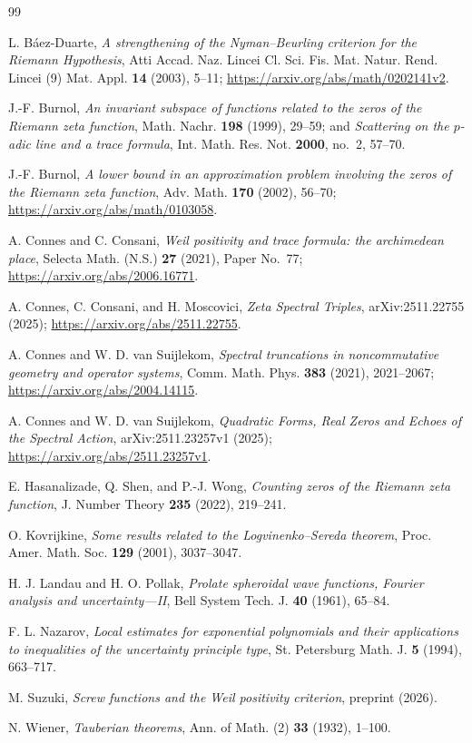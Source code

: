 \documentclass[11pt]{article}
\theoremstyle{remark}
\begin{document}
\begin{thebibliography}{99}

L. B\'aez-Duarte,
\emph{A strengthening of the Nyman--Beurling criterion for the Riemann Hypothesis},
Atti Accad. Naz. Lincei Cl. Sci. Fis. Mat. Natur. Rend. Lincei (9) Mat. Appl. \textbf{14} (2003), 5--11;
\url{https://arxiv.org/abs/math/0202141v2}.

J.-F. Burnol,
\emph{An invariant subspace of functions related to the zeros of the Riemann zeta function},
Math. Nachr. \textbf{198} (1999), 29--59; and \emph{Scattering on the $p$-adic line and a trace formula}, Int. Math. Res. Not. \textbf{2000}, no.~2, 57--70.

J.-F. Burnol,
\emph{A lower bound in an approximation problem involving the zeros of the Riemann zeta function},
Adv. Math. \textbf{170} (2002), 56--70;
\url{https://arxiv.org/abs/math/0103058}.

A. Connes and C. Consani,
\emph{Weil positivity and trace formula: the archimedean place},
Selecta Math. (N.S.) \textbf{27} (2021), Paper No.~77;
\url{https://arxiv.org/abs/2006.16771}.

A. Connes, C. Consani, and H. Moscovici,
\emph{Zeta Spectral Triples},
arXiv:2511.22755 (2025);
\url{https://arxiv.org/abs/2511.22755}.

A. Connes and W. D. van Suijlekom,
\emph{Spectral truncations in noncommutative geometry and operator systems},
Comm. Math. Phys. \textbf{383} (2021), 2021--2067;
\url{https://arxiv.org/abs/2004.14115}.

A. Connes and W. D. van Suijlekom,
\emph{Quadratic Forms, Real Zeros and Echoes of the Spectral Action},
arXiv:2511.23257v1 (2025);
\url{https://arxiv.org/abs/2511.23257v1}.

E. Hasanalizade, Q. Shen, and P.-J. Wong,
\emph{Counting zeros of the Riemann zeta function},
J. Number Theory \textbf{235} (2022), 219--241.

O. Kovrijkine,
\emph{Some results related to the Logvinenko--Sereda theorem},
Proc. Amer. Math. Soc. \textbf{129} (2001), 3037--3047.

H. J. Landau and H. O. Pollak,
\emph{Prolate spheroidal wave functions, Fourier analysis and uncertainty---II},
Bell System Tech. J. \textbf{40} (1961), 65--84.

F. L. Nazarov,
\emph{Local estimates for exponential polynomials and their applications to inequalities of the uncertainty principle type},
St. Petersburg Math. J. \textbf{5} (1994), 663--717.

M. Suzuki,
\emph{Screw functions and the Weil positivity criterion},
preprint (2026).

N. Wiener,
\emph{Tauberian theorems},
Ann. of Math. (2) \textbf{33} (1932), 1--100.

\end{thebibliography}
\end{document}
